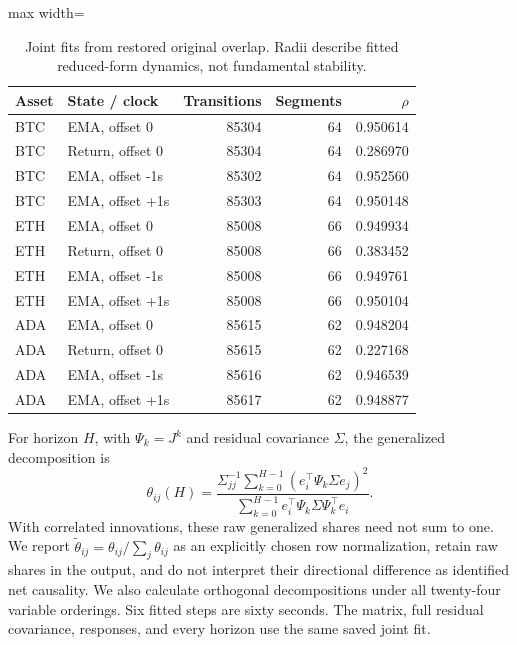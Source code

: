 \begin{table}[htbp]
\centering\small
\caption{Joint fits from restored original overlap. Radii describe fitted reduced-form dynamics, not fundamental stability.}\label{tab:joint_fit_recovered}
\begin{adjustbox}{max width=\textwidth}
\begin{tabular}{llrrr}\toprule
Asset & State / clock & Transitions & Segments & $\rho$\\\midrule
BTC & EMA, offset 0 & 85304 & 64 & 0.950614\\
BTC & Return, offset 0 & 85304 & 64 & 0.286970\\
BTC & EMA, offset -1s & 85302 & 64 & 0.952560\\
BTC & EMA, offset +1s & 85303 & 64 & 0.950148\\
ETH & EMA, offset 0 & 85008 & 66 & 0.949934\\
ETH & Return, offset 0 & 85008 & 66 & 0.383452\\
ETH & EMA, offset -1s & 85008 & 66 & 0.949761\\
ETH & EMA, offset +1s & 85008 & 66 & 0.950104\\
ADA & EMA, offset 0 & 85615 & 62 & 0.948204\\
ADA & Return, offset 0 & 85615 & 62 & 0.227168\\
ADA & EMA, offset -1s & 85616 & 62 & 0.946539\\
ADA & EMA, offset +1s & 85617 & 62 & 0.948877\\
\bottomrule\end{tabular}
\end{adjustbox}
\end{table}

For horizon $H$, with $\Psi_k=J^k$ and residual covariance $\Sigma$, the generalized decomposition \citep{pesaran1998} is
\[
\theta_{ij}(H)=\frac{\Sigma_{jj}^{-1}\sum_{k=0}^{H-1}(e_i^\top\Psi_k\Sigma e_j)^2}{\sum_{k=0}^{H-1} e_i^\top\Psi_k\Sigma\Psi_k^\top e_i}.
\]
With correlated innovations, these raw generalized shares need not sum to one. We report $\widetilde\theta_{ij}=\theta_{ij}/\sum_j\theta_{ij}$ as an explicitly chosen row normalization, retain raw shares in the output, and do not interpret their directional difference as identified net causality. We also calculate orthogonal decompositions under all twenty-four variable orderings. Six fitted steps are sixty seconds. The matrix, full residual covariance, responses, and every horizon use the same saved joint fit.


